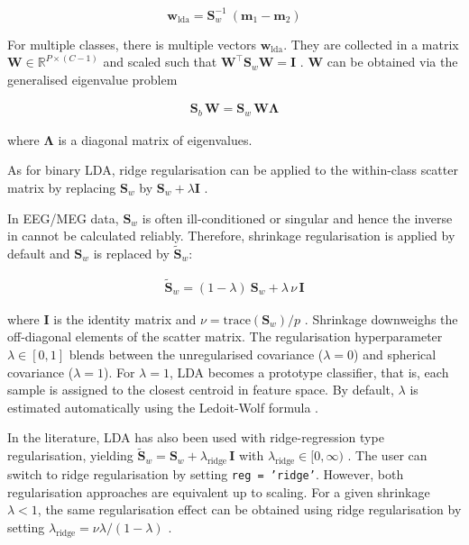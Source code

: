 \documentclass[utf8]{frontiersSCNS} %
\newcommand{\m}{\mathbf{m}}
\newcommand{\w}{\mathbf{w}}
\newcommand{\I}{\mathbf{I}}
\newcommand{\R}{\mathbb{R}}
\renewcommand{\S}{\mathbf{S}}
\newcommand{\W}{\mathbf{W}}
\newcommand{\ttt}[1]{\texttt{#1}}
\begin{document}
\begin{equation}
\label{eq:lda_solution}
\w_{\text{lda}} = \S_w^{-1}\ (\m_1 - \m_2)
\end{equation}

For multiple classes, there is multiple vectors $\w_{\text{lda}}$. They are collected in a matrix $\W\in\R^{P\times(C-1)}$ and scaled such that $\W^\top\S_w\W = \I$ \citep{Bishop2007}. $\W$ can be obtained via the generalised eigenvalue problem

\begin{align}
\label{eq:LDA-eigenvalue-multiclass}
\S_b\,\W = \S_w\,\W\mathbf{\Lambda}
\end{align}

where $\mathbf{\Lambda}$ is a diagonal matrix of eigenvalues.

As for binary LDA, ridge regularisation can be applied to the within-class scatter matrix by replacing $\S_w$ by $\S_w+\lambda\I$ \citep{Friedman1989}.

In EEG/MEG data, $\S_w$ is often ill-conditioned or singular and hence the inverse in  cannot be calculated reliably. Therefore, shrinkage regularisation is applied by default and $\S_w$ is replaced by $\widetilde{\S}_w$:

\begin{align}
\label{eq:shrinkage}
\widetilde{\S}_w = (1-\lambda)\ \S_w + \lambda\,\nu\,\I
\end{align}

where $\I$ is the identity matrix and $\nu = \text{trace}(\S_w)/p$ \citep{Blankertz2011}. Shrinkage downweighs the off-diagonal elements of the scatter matrix. The regularisation hyperparameter $\lambda\in [0,1]$ blends between the unregularised covariance ($\lambda=0$) and spherical covariance ($\lambda=1$). For $\lambda=1$, LDA becomes a prototype classifier, that is, each sample is assigned to the closest centroid in feature space. By default, $\lambda$ is estimated automatically using the Ledoit-Wolf formula \citep{Ledoit2003HoneyMatrix,Blankertz2011}.

In the literature, LDA has also been used with ridge-regression type regularisation, yielding $\widetilde{\S}_w = \S_w + \lambda_\text{ridge}\,\I$ with $\lambda_\text{ridge}\in [0,\infty)$ \citep{Friedman1989RegularizedAnalysis}. The user can switch to ridge regularisation by setting \ttt{reg = 'ridge'}. However, both regularisation approaches are equivalent up to scaling. For a given shrinkage $\lambda<1$, the same regularisation effect can be obtained using ridge regularisation by setting $\lambda_\text{ridge} = \nu\lambda / (1-\lambda)$
\citep{Treder2018Cross-validationLDA}.
\end{document}
